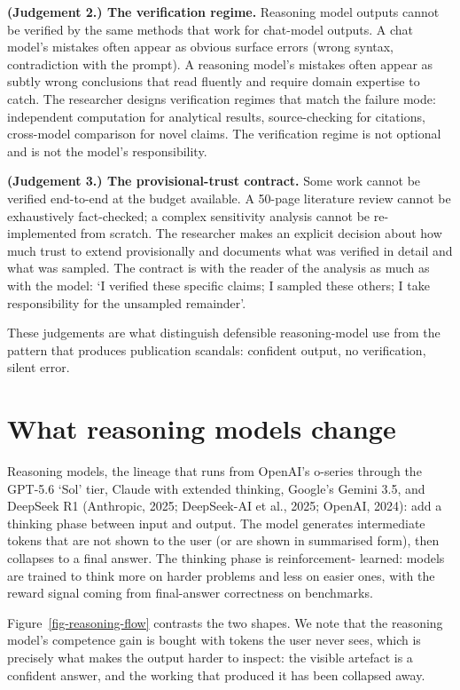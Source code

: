 \documentclass[
  letterpaper,
  11pt]{scrbook}
\begin{document}
\textbf{(Judgement 2.) The verification regime.} Reasoning model outputs
cannot be verified by the same methods that work for chat-model outputs.
A chat model's mistakes often appear as obvious surface errors (wrong
syntax, contradiction with the prompt). A reasoning model's mistakes
often appear as subtly wrong conclusions that read fluently and require
domain expertise to catch. The researcher designs verification regimes
that match the failure mode: independent computation for analytical
results, source-checking for citations, cross-model comparison for novel
claims. The verification regime is not optional and is not the model's
responsibility.

\textbf{(Judgement 3.) The provisional-trust contract.} Some work cannot
be verified end-to-end at the budget available. A 50-page literature
review cannot be exhaustively fact-checked; a complex sensitivity
analysis cannot be re-implemented from scratch. The researcher makes an
explicit decision about how much trust to extend provisionally and
documents what was verified in detail and what was sampled. The contract
is with the reader of the analysis as much as with the model: `I
verified these specific claims; I sampled these others; I take
responsibility for the unsampled remainder'.

These judgements are what distinguish defensible reasoning-model use
from the pattern that produces publication scandals: confident output,
no verification, silent error.

\section{What reasoning models
change}\label{what-reasoning-models-change}

Reasoning models, the lineage that runs from OpenAI's o-series through
the GPT-5.6 `Sol' tier, Claude with extended thinking, Google's Gemini
3.5, and DeepSeek R1 (Anthropic, 2025; {DeepSeek-AI et al.}, 2025;
OpenAI, 2024): add a thinking phase between input and output. The model
generates intermediate tokens that are not shown to the user (or are
shown in summarised form), then collapses to a final answer. The
thinking phase is reinforcement- learned: models are trained to think
more on harder problems and less on easier ones, with the reward signal
coming from final-answer correctness on benchmarks.

Figure~\ref{fig-reasoning-flow} contrasts the two shapes. We note that
the reasoning model's competence gain is bought with tokens the user
never sees, which is precisely what makes the output harder to inspect:
the visible artefact is a confident answer, and the working that
produced it has been collapsed away.
\end{document}
